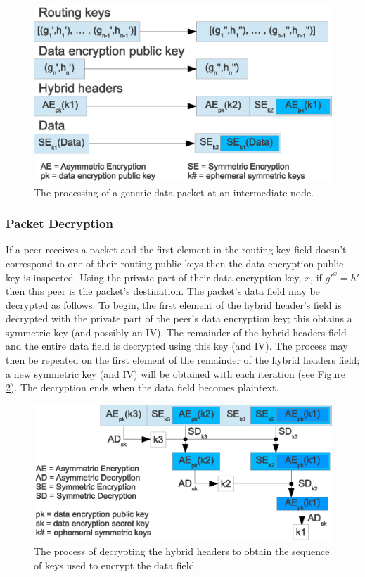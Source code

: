 \documentclass[ %
                    author={Luke Murray},
                supervisor={Dr. Simon Hollis},
                     title={Shadow Peer-to-Peer Networks},
                  subtitle={},
                    degree={MEng},
                      year={2013} ]{thesis}
\begin{document}
\begin{figure}[h]
    \centering
    \includegraphics{diagrams/packet_generic_proc.eps}
    \caption{The processing of a generic data packet at an intermediate node.}
    \label{packet_generic_proc}
\end{figure}

\subsubsection{Packet Decryption}

If a peer receives a packet and the first element in the routing key field doesn't correspond to one of their routing public keys then the data encryption public key is inspected. Using the private part of their data encryption key, $x$, if $g\prime^{x} = h\prime$ then this peer is the packet's destination. The packet's data field may be decrypted as follows. To begin, the first element of the hybrid header's field is decrypted with the private part of the peer's data encryption key; this obtains a symmetric key (and possibly an IV). The remainder of the hybrid headers field and the entire data field is decrypted using this key (and IV). The process may then be repeated on the first element of the remainder of the hybrid headers field; a new symmetric key (and IV) will be obtained with each iteration (see Figure \ref{hybrid_decrypt}). The decryption ends when the data field becomes plaintext.

\begin{figure}[h]
    \centering
    \includegraphics{diagrams/hybrid_header_decryption2.eps}
    \caption{The process of decrypting the hybrid headers to obtain the sequence of keys used to encrypt the data field.}
    \label{hybrid_decrypt}
\end{figure}
\end{document}
